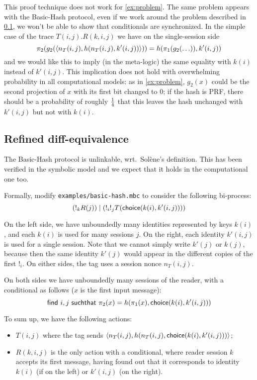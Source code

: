 \begin{example} \label{ex:indep}
  This proof technique does not work for \cref{ex:problem}.
  The same problem appears with the Basic-Hash protocol, even if we work around
the problem described in \cref{sec:refined-diff}, we won't be able to show
that conditionals are synchronized.  In the simple case of the trace
$T(i,j).R(k,i,j)$ we have
on the single-session side
$$\pi_2(g_2(\langle n_T(i,j),h(n_T(i,j),k'(i,j)) \rangle)) =
 h(\pi_1(g_2(\ldots)),k'(i,j))$$
and we would like this to imply (in the meta-logic)
the same equality with $k(i)$ instead of $k'(i,j)$.
This implication does not hold with overwhelming probability in all
computational models: as in \cref{ex:problem}, $g_2(x)$ could be the second
projection of $x$ with its first bit changed to $0$; if the hash is PRF,
there should be a probability of roughly $1 \over 4$ that this leaves
the hash unchanged with $k'(i,j)$ but not with $k(i)$.
\end{example}

\subsection{Refined diff-equivalence} \label{sec:refined-diff}

The Basic-Hash protocol is unlinkable, wrt.\ Solène's definition.
This has been verified in the symbolic model and we expect that it holds
in the computational one too.

Formally, modify \texttt{examples/basic-hash.mbc} to consider the
following bi-process:
$$(!_k R(j)) \mid (!_i !_j T(\mathsf{choice}(k(i),k'(i,j))))$$

On the left side, we have unboundedly many
identities represented by keys $k(i)$, and each $k(i)$ is used for
many sessions $j$.
On the right, each identity $k'(i,j)$ is used for a single session.
Note that we cannot simply write $k'(j)$ or $k(j)$, because then the
same identity $k'(j)$ would appear in the different copies of the
first $!_i$.
On either sides, the tag uses a session nonce $n_T(i,j)$.

On both sides we have unboundedly many sessions of the reader,
with a conditional as follows ($x$ is the first input message):
$$\mathsf{find} \ i,j \ \mathsf{suchthat} \ \pi_2(x) =
h(\pi_1(x),\mathsf{choice}(k(i),k'(i,j)))$$

To sum up, we have the following actions:
\begin{itemize}
  \item $T(i,j)$ where the tag sends
    $\langle n_T(i,j),h(n_T(i,j),\mathsf{choice}(k(i),k'(i,j))) \rangle$;
  \item $R(k,i,j)$ is the only action with a conditional,
    where reader session $k$ accepts its first message,
    having found out that it corresponds to identity $k(i)$ (if on
    the left) or $k'(i,j)$ (on the right).
\end{itemize}

